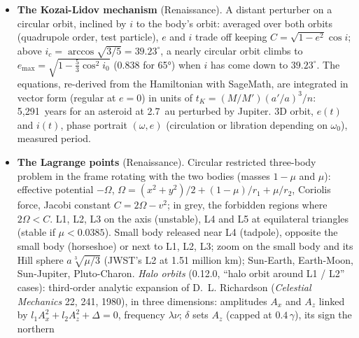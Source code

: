 \begin{itemize}
asteroid's size (ellipse of semi-axes $a$, $b$); it sweeps the Earth at $v=\sqrt{GM_\odot/1\,\text{au}}\,(1-1/\sqrt{r})$
at opposition (10.9~km\,s$^{-1}$ at 2.5~au, 26.7~km\,s$^{-1}$ for Eris). Each observer of a line drawn across the path
sees the star vanish for the time of one chord: duration $=$ chord$/v$. Light curves of each observer, measured
chords with the timing error $\sigma v$, least-squares ellipse fitted to their ends (at least three chords) and
compared with the true shape; prediction error (the ``negatives'' at the edges), Fresnel scale
$\sqrt{\lambda\Delta/2}$, star diameter projected $\theta\Delta$ (a supergiant is only partly hidden).
\item \textbf{The Kozai-Lidov mechanism} (Renaissance). A distant perturber on a circular orbit, inclined by $i$ to
the body's orbit: averaged over both orbits (quadrupole order, test particle), $e$ and $i$ trade off keeping
$C=\sqrt{1-e^2}\cos i$; above $i_c=\arccos\sqrt{3/5}=39.23^\circ$, a nearly circular orbit climbs to
$e_\text{max}=\sqrt{1-\tfrac53\cos^2 i_0}$ (0.838 for 65°) when $i$ has come down to $39.23^\circ$. The equations,
re-derived from the Hamiltonian with SageMath, are integrated in vector form (regular at $e=0$) in units of
$t_K=(M/M')(a'/a)^3/n$: 5,291~years for an asteroid at 2.7~au perturbed by Jupiter. 3D orbit, $e(t)$ and $i(t)$, phase
portrait $(\omega,e)$ (circulation or libration depending on $\omega_0$), measured period.
\item \textbf{The Lagrange points} (Renaissance). Circular restricted three-body problem in the frame rotating with the
two bodies (masses $1-\mu$ and $\mu$): effective potential $-\Omega$, $\Omega=(x^2+y^2)/2+(1-\mu)/r_1+\mu/r_2$, Coriolis
force, Jacobi constant $C=2\Omega-v^2$; in grey, the forbidden regions where $2\Omega<C$. L1, L2, L3 on the axis
(unstable), L4 and L5 at equilateral triangles (stable if $\mu<0.0385$). Small body released near L4 (tadpole),
opposite the small body (horseshoe) or next to L1, L2, L3; zoom on the small body and its Hill sphere
$a\sqrt[3]{\mu/3}$ (JWST's L2 at 1.51 million km); Sun-Earth, Earth-Moon, Sun-Jupiter, Pluto-Charon.
\emph{Halo orbits} (0.12.0, “halo orbit around L1 / L2” cases): third-order analytic expansion of D.~L. Richardson
(\emph{Celestial Mechanics} 22, 241, 1980), in three dimensions: amplitudes $A_x$ and $A_z$ linked by
$l_1A_x^2+l_2A_z^2+\Delta=0$, frequency $\lambda\nu$; $\delta$ sets $A_z$ (capped at $0.4\,\gamma$), its sign the northern

\end{itemize}
